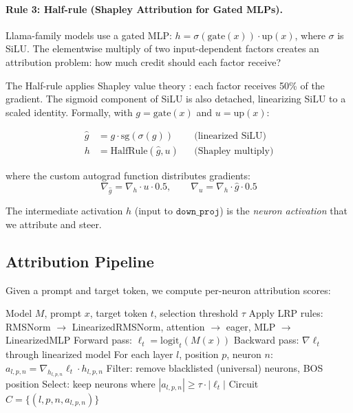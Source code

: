 \documentclass[11pt]{article}
\begin{document}
\paragraph{Rule 3: Half-rule (Shapley Attribution for Gated MLPs).}
Llama-family models use a gated MLP: $h = \sigma(\text{gate}(x)) \cdot \text{up}(x)$, where $\sigma$ is SiLU.
The elementwise multiply of two input-dependent factors creates an attribution problem: how much credit should each factor receive?

The Half-rule applies Shapley value theory \citep{shapley1953value}: each factor receives 50\% of the gradient.
The sigmoid component of SiLU is also detached, linearizing SiLU to a scaled identity.
Formally, with $g = \text{gate}(x)$ and $u = \text{up}(x)$:

\begin{align}
    \hat{g} &= g \cdot \text{sg}(\sigma(g))  && \text{(linearized SiLU)} \\
    h &= \text{HalfRule}(\hat{g}, u) && \text{(Shapley multiply)}
\end{align}

where the custom autograd function distributes gradients:
\begin{equation}
    \nabla_{\hat{g}} = \nabla_h \cdot u \cdot 0.5, \qquad \nabla_u = \nabla_h \cdot \hat{g} \cdot 0.5
\end{equation}

The intermediate activation $h$ (input to $\texttt{down\_proj}$) is the \emph{neuron activation} that we attribute and steer.

\subsection{Attribution Pipeline}
\label{sec:pipeline}

Given a prompt and target token, we compute per-neuron attribution scores:

\begin{algorithm}[h]
\caption{Neuron Circuit Discovery via RelP}
\label{alg:discovery}
\begin{algorithmic}[1]
\REQUIRE Model $M$, prompt $x$, target token $t$, selection threshold $\tau$
\STATE Apply LRP rules: RMSNorm $\to$ LinearizedRMSNorm, attention $\to$ eager, MLP $\to$ LinearizedMLP
\STATE Forward pass: $\ell_t = \text{logit}_t(M(x))$
\STATE Backward pass: $\nabla \ell_t$ through linearized model
\STATE For each layer $l$, position $p$, neuron $n$: $a_{l,p,n} = \nabla_{h_{l,p,n}} \ell_t \cdot h_{l,p,n}$
\STATE Filter: remove blacklisted (universal) neurons, BOS position
\STATE Select: keep neurons where $|a_{l,p,n}| \geq \tau \cdot |\ell_t|$
\RETURN Circuit $C = \{(l, p, n, a_{l,p,n})\}$
\end{algorithmic}
\end{algorithm}
\end{document}
